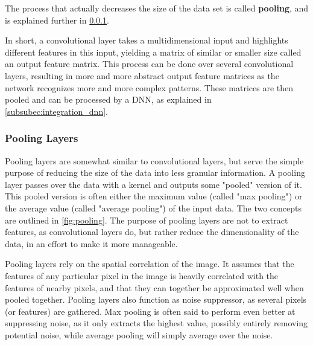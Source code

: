 \documentclass[10pt, twocolumn]{article}
\begin{document}
The process that actually decreases the size of the data set is called \textbf{pooling}, and is explained further in \cref{subsubsec:pooling}.

In short, a convolutional layer takes a multidimensional input and highlights different features in this input, yielding a matrix of similar or smaller size called an output feature matrix. This process can be done over several convolutional layers, resulting in more and more abstract output feature matrices as the network recognizes more and more complex patterns. These matrices are then pooled and can be processed by a DNN, as explained in \cref{subsubec:integration_dnn}.


\subsubsection{Pooling Layers}\label{subsubsec:pooling}
Pooling layers are somewhat similar to convolutional layers, but serve the simple purpose of reducing the size of the data into less granular information. A pooling layer passes over the data with a kernel and outputs some "pooled" version of it. This pooled version is often either the maximum value (called "max pooling") or the average value (called "average pooling") of the input data. The two concepts are outlined in \cref{fig:pooling}. The purpose of pooling layers are not to extract features, as convolutional layers do, but rather reduce the dimensionality of the data, in an effort to make it more manageable.

Pooling layers rely on the spatial correlation of the image. It assumes that the features of any particular pixel in the image is heavily correlated with the features of nearby pixels, and that they can together be approximated well when pooled together. Pooling layers also function as noise suppressor, as several pixels (or features) are gathered. Max pooling is often said to perform even better at suppressing noise, as it only extracts the highest value, possibly entirely removing potential noise, while average pooling will simply average over the noise.
\end{document}
